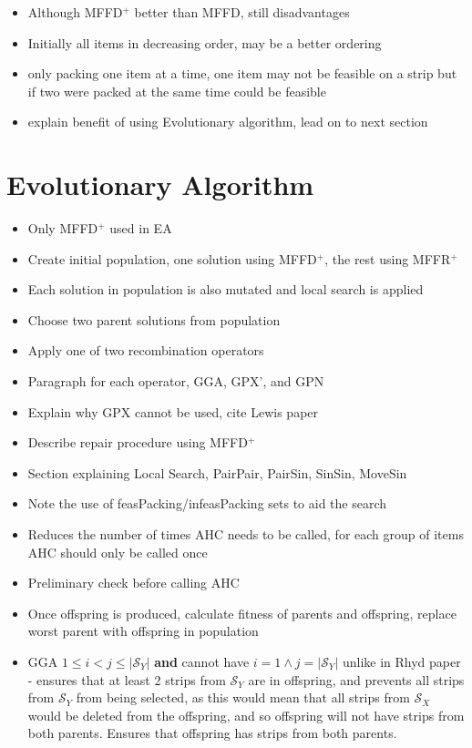 \documentclass{elsarticle}
\begin{document}
\begin{itemize}
	\item Although MFFD$^+$ better than MFFD, still disadvantages
	\item Initially all items in decreasing order, may be a better ordering
	\item only packing one item at a time, one item may not be feasible on a strip but if two were packed at the same time could be feasible
	\item explain benefit of using Evolutionary algorithm, lead on to next section
\end{itemize}


\section{Evolutionary Algorithm}
\begin{itemize}
	\item Only MFFD$^+$ used in EA
	\item Create initial population, one solution using MFFD$^+$, the rest using MFFR$^+$
	\item Each solution in population is also mutated and local search is applied
	\item Choose two parent solutions from population
	\item Apply one of two recombination operators
	\item Paragraph for each operator, GGA, GPX', and GPN
	\item Explain why GPX cannot be used, cite Lewis paper
	\item Describe repair procedure using MFFD$^+$
	\item Section explaining Local Search, PairPair, PairSin, SinSin, MoveSin
	\item Note the use of feasPacking/infeasPacking sets to aid the search
	\item Reduces the number of times AHC needs to be called, for each group of items AHC should only be called once
	\item Preliminary check before calling AHC
	\item Once offspring is produced, calculate fitness of parents and offspring, replace worst parent with offspring in population
	\item GGA $1 \leq i < j \leq |\mathcal{S}_Y|$ \textbf{and} cannot have $i = 1 \land j = |\mathcal{S}_Y|$ unlike in Rhyd paper - ensures that at least 2 strips from $\mathcal{S}_Y$ are in offspring, and prevents all strips from $\mathcal{S}_Y$ from being selected, as this would mean that all strips from $\mathcal{S}_X$ would be deleted from the offspring, and so offspring will not have strips from both parents. Ensures that offspring has strips from both parents.
\end{itemize}
\end{document}
